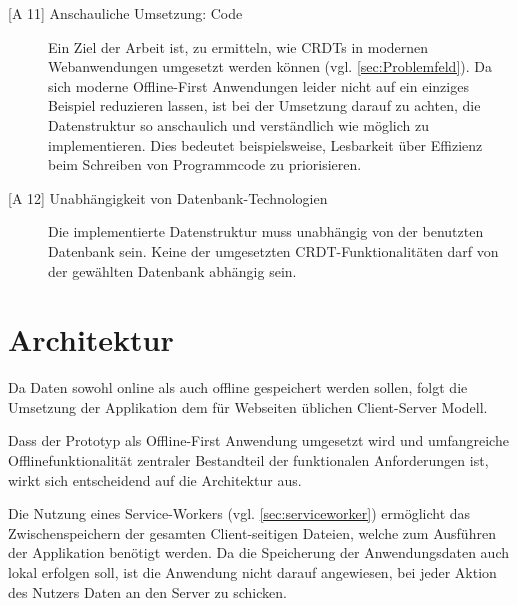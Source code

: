 \documentclass[a4paper, 12pt]{scrreprt}
\begin{document}
\begin{description}
	\item[{[A 11]} Anschauliche Umsetzung: Code]
	Ein Ziel der Arbeit ist, zu ermitteln, wie \acp{CRDT} in modernen Webanwendungen umgesetzt werden können (vgl. \ref{sec:Problemfeld}). Da sich moderne Offline-First Anwendungen leider nicht auf ein einziges Beispiel reduzieren lassen, ist bei der Umsetzung darauf zu achten, die Datenstruktur so anschaulich und verständlich wie möglich zu implementieren. Dies bedeutet beispielsweise, Lesbarkeit über Effizienz beim Schreiben von Programmcode zu priorisieren.
	\item[{[A 12]} Unabhängigkeit von Datenbank-Technologien]
	Die implementierte Datenstruktur muss unabhängig von der benutzten Datenbank sein. Keine der umgesetzten CRDT-Funktionalitäten darf von der gewählten Datenbank abhängig sein.
\end{description}

\section{Architektur}
\label{sec:Architektur}

Da Daten sowohl online als auch offline gespeichert werden sollen, folgt die Umsetzung der Applikation dem für Webseiten üblichen Client-Server Modell. 

Dass der Prototyp als Offline-First Anwendung umgesetzt wird und umfangreiche Offlinefunktionalität zentraler Bestandteil der funktionalen Anforderungen ist, wirkt sich entscheidend auf die Architektur aus.

Die Nutzung eines Service-Workers (vgl. \ref{sec:serviceworker}) ermöglicht das Zwischenspeichern der gesamten Client-seitigen Dateien, welche zum Ausführen der Applikation benötigt werden. Da die Speicherung der Anwendungsdaten auch lokal erfolgen soll, ist die Anwendung nicht darauf angewiesen, bei jeder Aktion des Nutzers Daten an den Server zu schicken.
\end{document}
